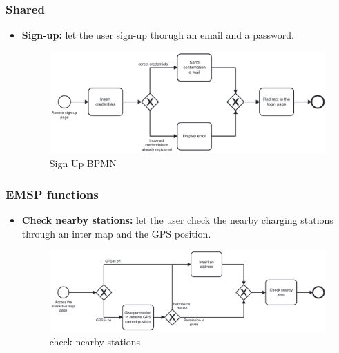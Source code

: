 \documentclass[table, 12pt]{article} %
\begin{document}
        \subsubsection{Shared}
        \begin{itemize}
            \item \textbf{Sign-up:} let the user sign-up thorugh an email and a password.
        
            \begin{center}
                \begin{figure}[!h]
                    \includegraphics[width=\textwidth]{assets/bpmn/sign-up.png}
                    \caption{Sign Up BPMN}
                    \label{fig: singup}
                \end{figure}
            \end{center}
        \end{itemize}
        
    \newpage

        \subsubsection{EMSP functions}
        \begin{itemize}                                 
            \item \textbf{Check nearby stations:} let the user check the nearby charging stations through an inter map and the GPS position.
        
            \begin{center}
                \begin{figure}[!h]
                    \includegraphics[scale=0.60, center]{assets/bpmn/Check area.png}
                    \caption{check nearby stations}
                    \label{fig: check nearby stations}
                \end{figure}
            \end{center}
        \end{itemize}
        
\end{document}

